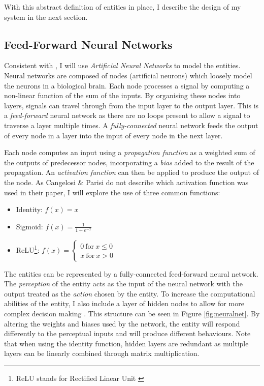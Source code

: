 \documentclass[12pt,a4paper,twoside,openright]{report}
\begin{document}
With this abstract definition of entities in place, I describe the design of my system in the next section.

\subsection{Feed-Forward Neural Networks}\label{section:neural}

Consistent with \citet{Cangelosi1998}, I will use \emph{Artificial Neural Networks} to model the entities. Neural networks are composed of nodes (artificial neurons) which loosely model the neurons in a biological brain. Each node processes a signal by computing a non-linear function of the sum of the inputs. By organising these nodes into layers, signals can travel through from the input layer to the output layer. This is a \emph{feed-forward} neural network as there are no loops present to allow a signal to traverse a layer multiple times. A \emph{fully-connected} neural network feeds the output of every node in a layer into the input of every node in the next layer. 

Each node computes an input using a \emph{propagation function} as a weighted sum of the outputs of predecessor nodes, incorporating a \emph{bias} added to the result of the propagation. An \emph{activation function} can then be applied to produce the output of the node. As Cangelosi \& Parisi do not describe which activation function was used in their paper, I will explore the use of three common functions:

\begin{itemize}
	\item Identity: $f(x) = x$
	\item Sigmoid: $f(x) = \frac{1}{1+e^{-x}}$
	\item ReLU\footnote{ReLU stands for Rectified Linear Unit \citep{nair2010rectified}}:	$ f(x) = 
    \left\{
        \begin{array}{ll}
          0~\mathrm{for}~x \leq 0 \\
          x~\mathrm{for}~x > 0
        \end{array}
      \right.
      $
\end{itemize}

The entities can be represented by a fully-connected feed-forward neural network. The  \emph{perception} of the entity acts as the input of the neural network with the output treated as the \emph{action} chosen by the entity. To increase the computational abilities of the entity, I also include a layer of hidden nodes to allow for more complex decision making \citep{de1993backpropagation}. This structure can be seen in Figure \ref{fig:neuralnet}. By altering the weights and biases used by the network, the entity will respond differently to the perceptual inputs and will produce different behaviours. Note that when using the identity function, hidden layers are redundant as multiple layers can be linearly combined through matrix multiplication.
\end{document}
